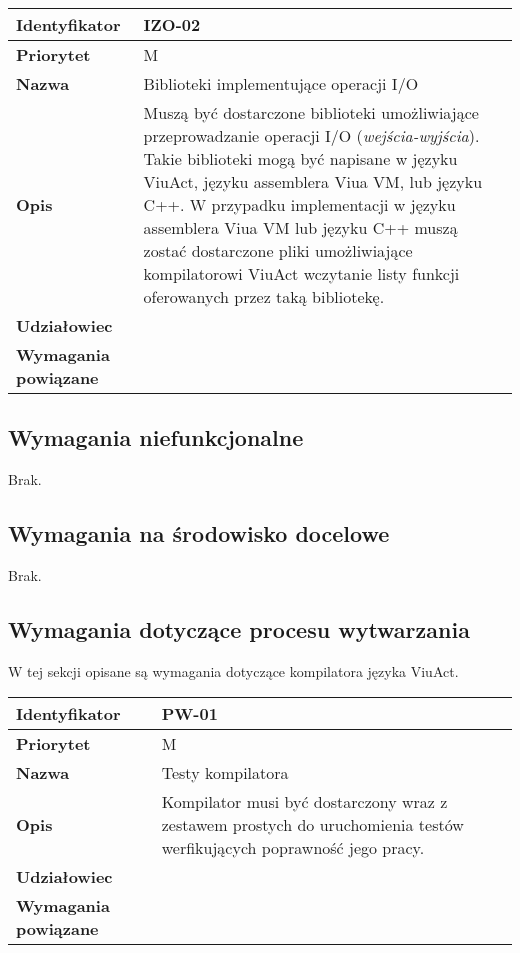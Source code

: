 \documentclass[11pt,oneside,a4paper,titlepage,onecolumn]{article}
\begin{document}
\begin{tabular}{ | l | l | }
    \hline
    \textbf{Identyfikator} & \parbox[t]{11cm}{IZO-02} \\
    \hline
    \textbf{Priorytet} & M \\
    \hline
    \textbf{Nazwa} & Biblioteki implementujące operacji I/O \\
    \hline
    \textbf{Opis} & \parbox[t]{11cm}{
        Muszą być dostarczone biblioteki umożliwiające przeprowadzanie operacji I/O (\emph{wejścia-wyjścia}).
        Takie biblioteki mogą być napisane w języku ViuAct, języku assemblera Viua VM, lub języku C++.
        W przypadku implementacji w języku assemblera Viua VM lub języku C++ muszą zostać dostarczone pliki
        umożliwiające kompilatorowi ViuAct wczytanie listy funkcji oferowanych przez taką bibliotekę.
    } \\
    \hline
    \textbf{Udziałowiec} & \phantom{} \\
    \hline
    \textbf{Wymagania powiązane} & \phantom{} \\
    \hline
\end{tabular}

\subsection{Wymagania niefunkcjonalne}

Brak.

\subsection{Wymagania na środowisko docelowe}

Brak.

\subsection{Wymagania dotyczące procesu wytwarzania}

W tej sekcji opisane są wymagania dotyczące kompilatora języka ViuAct.

\vspace{1em}

\begin{tabular}{ | l | l | }
    \hline
    \textbf{Identyfikator} & \parbox[t]{11cm}{PW-01} \\
    \hline
    \textbf{Priorytet} & M \\
    \hline
    \textbf{Nazwa} & Testy kompilatora \\
    \hline
    \textbf{Opis} & \parbox[t]{11cm}{
        Kompilator musi być dostarczony wraz z zestawem prostych do uruchomienia testów werfikujących
        poprawność jego pracy.
    } \\
    \hline
    \textbf{Udziałowiec} & \phantom{} \\
    \hline
    \textbf{Wymagania powiązane} & \phantom{} \\
    \hline
\end{tabular}
\end{document}
